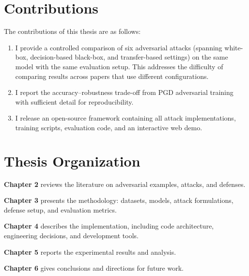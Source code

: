 \section{Contributions}

The contributions of this thesis are as follows:

\begin{enumerate}
    \item I provide a controlled comparison of six adversarial attacks (spanning white-box, decision-based black-box, and transfer-based settings) on the same model with the same evaluation setup. This addresses the difficulty of comparing results across papers that use different configurations.
    \item I report the accuracy--robustness trade-off from PGD adversarial training with sufficient detail for reproducibility.
    \item I release an open-source framework containing all attack implementations, training scripts, evaluation code, and an interactive web demo.
\end{enumerate}

\section{Thesis Organization}

\textbf{Chapter 2} reviews the literature on adversarial examples, attacks, and defenses.

\textbf{Chapter 3} presents the methodology: datasets, models, attack formulations, defense setup, and evaluation metrics.

\textbf{Chapter 4} describes the implementation, including code architecture, engineering decisions, and development tools.

\textbf{Chapter 5} reports the experimental results and analysis.

\textbf{Chapter 6} gives conclusions and directions for future work.

